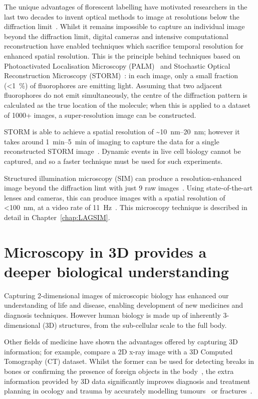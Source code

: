 The unique advantages of florescent labelling have motivated researchers in the last two decades to invent optical methods to image at resolutions below the diffraction limit~\cite{cornea2014fluorescence}.
Whilst it remains impossible to capture an individual image beyond the diffraction limit, digital cameras and intensive computational reconstruction have enabled techniques which sacrifice temporal resolution for enhanced spatial resolution.
This is the principle behind techniques based on Photoactivated Localisation Microscopy (PALM)~\cite{betzig2006imaging} and Stochastic Optical Reconstruction Microscopy (STORM)~\cite{rust2006sub}: in each image, only a small fraction (<\SI{1}{\percent}) of fluorophores are emitting light.
Assuming that two adjacent fluorophores do not emit simultaneously, the centre of the diffraction pattern is calculated as the true location of the molecule; when this is applied to a dataset of \num{1000}+ images, a super-resolution image can be constructed. 

STORM is able to achieve a spatial resolution of \textasciitilde\SIrange[range-phrase=--]{10}{20}{\nano\metre}; however it takes around \SIrange[range-phrase=--]{1}{5}{\minute} of imaging to capture the data for a single reconstructed STORM image~\cite{heilemann2008subdiffraction}.
Dynamic events in live cell biology cannot be captured, and so a faster technique must be used for such experiments. 

Structured illumination microscopy (SIM) can produce a resolution-enhanced image beyond the diffraction limt with just 9 raw images~\cite{gustafsson2000surpassing}.
Using state-of-the-art lenses and cameras, this can produce images with a spatial resolution of <\SI{100}{\nano\metre}, at a video rate of \SI{11}{\hertz}~\cite{young2016guide}.  
This microscopy technique is described in detail in Chapter~\ref{chap:LAGSIM}. 

\section{Microscopy in 3D provides a deeper biological understanding}
Capturing 2-dimensional images of microscopic biology has enhanced our understanding of life and disease, enabling development of new medicines and diagnosis techniques. %
However human biology is made up of inherently 3-dimensional (3D) structures, from the sub-cellular scale to the full body. 

Other fields of medicine have shown the advantages offered by capturing 3D information; for example, compare a 2D x-ray image with a 3D Computed Tomography (CT) dataset. 
Whilst the former can be used for detecting breaks in bones or confirming the presence of foreign objects in the body~\cite{markose2009three}, the extra information provided by 3D data significantly improves diagnosis and treatment planning in ocology and trauma by accurately modelling tumours~\cite{zhang2013thin} or fractures~\cite{rangarajan2013three}. 

